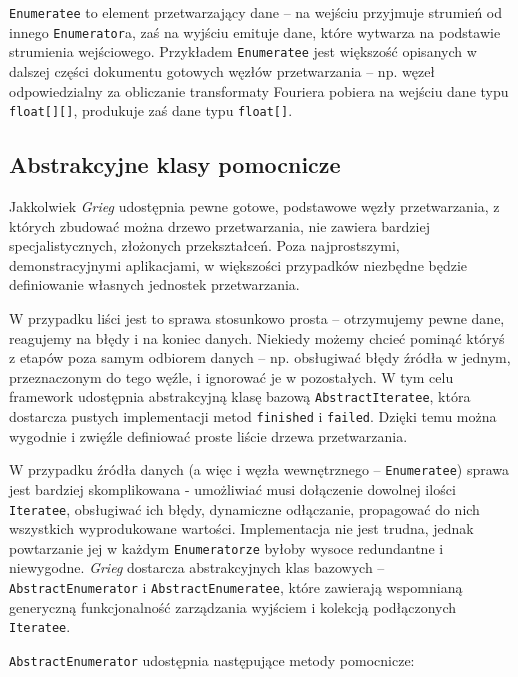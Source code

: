 \texttt{Enumeratee} to element przetwarzający dane -- na wejściu przyjmuje strumień od innego
\texttt{Enumerator}a, zaś na wyjściu emituje dane, które wytwarza na podstawie strumienia
wejściowego.  Przykładem \texttt{Enumeratee} jest większość opisanych w dalszej części dokumentu
gotowych węzłów przetwarzania -- np. węzeł odpowiedzialny za obliczanie transformaty Fouriera
pobiera na wejściu dane typu \texttt{float[][]}, produkuje zaś dane typu \texttt{float[]}.


\subsection{Abstrakcyjne klasy pomocnicze}

Jakkolwiek \emph{Grieg} udostępnia pewne gotowe, podstawowe węzły przetwarzania, z których zbudować
można drzewo przetwarzania, nie zawiera bardziej specjalistycznych, złożonych przekształceń. Poza
najprostszymi, demonstracyjnymi aplikacjami, w większości przypadków niezbędne będzie definiowanie
własnych jednostek przetwarzania.

W przypadku liści jest to sprawa stosunkowo prosta -- otrzymujemy pewne dane, reagujemy na błędy i
na koniec danych. Niekiedy możemy chcieć pominąć któryś z etapów poza samym odbiorem danych -- np.
obsługiwać błędy źródła w jednym, przeznaczonym do tego węźle, i ignorować je w pozostałych. W tym
celu framework udostępnia abstrakcyjną klasę bazową \texttt{AbstractIteratee}, która dostarcza
pustych implementacji metod \texttt{finished} i \texttt{failed}. Dzięki temu można wygodnie i
zwięźle definiować proste liście drzewa przetwarzania.

W przypadku źródła danych (a więc i węzła wewnętrznego -- \texttt{Enumeratee}) sprawa jest bardziej
skomplikowana - umożliwiać musi dołączenie dowolnej ilości \texttt{Iteratee}, obsługiwać ich błędy,
dynamiczne odłączanie, propagować do nich wszystkich wyprodukowane wartości. Implementacja nie jest
trudna, jednak powtarzanie jej w każdym \texttt{Enumeratorze} byłoby wysoce redundantne i
niewygodne. \emph{Grieg} dostarcza abstrakcyjnych klas bazowych -- \texttt{AbstractEnumerator} i
\texttt{AbstractEnumeratee}, które zawierają wspomnianą generyczną funkcjonalność zarządzania
wyjściem i kolekcją podłączonych \texttt{Iteratee}.

\texttt{AbstractEnumerator} udostępnia następujące metody pomocnicze:

